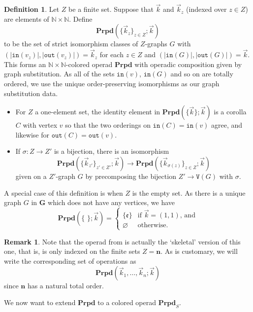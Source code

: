 \documentclass{amsart}
\numberwithin{theorem}{subsection}
\theoremstyle{definition}
\newtheorem{definition}[theorem]{Definition}
\newtheorem{remark}[theorem]{Remark}
\newcommand{\xfe}{\mathfrak{e}}
\newcommand{\bbY}{\mathbf{G}}
\newcommand{\out}{\mathtt{out}}
\newcommand{\inp}{\mathtt{in}}
\newcommand{\vertex}{\mathtt{V}}
\newcommand{\bfproperad}{\mathbf{Prpd}}
\newcommand{\nsqelt}[1]{\vec{#1}}
\begin{document}
\begin{definition}\label{def Prd}
Let $Z$ be a finite set.
Suppose that $\nsqelt{k}$ and $\nsqelt{k}_z$ (indexed over $z\in Z$) are elements of $\mathbb{N}\times\mathbb{N}$.
Define
\[
	\bfproperad(\{\nsqelt{k}_z\}_{z\in Z}; \nsqelt{k})
\]
to be the set of strict isomorphism classes of $Z$-graphs $G$ with $(|\inp(v_z)|, |\out(v_z)|) = \nsqelt{k}_z$ for each $z \in Z$ and $(|\inp(G)|, |\out(G)|) = \nsqelt{k}$.
This forms an $\mathbb{N}\times \mathbb{N}$-colored operad $\bfproperad$ with operadic composition given by graph substitution.
As all of the sets $\inp(v)$, $\inp(G)$ and so on are totally ordered, we use the unique order-preserving isomorphisms as our graph substitution data.
\begin{itemize}
	\item 
	For $Z$ a one-element set, the identity element in $\bfproperad(\{\nsqelt{k}\}; \nsqelt{k})$ is a corolla $C$ with vertex $v$ so that the two orderings on $\inp(C) = \inp(v)$ agree, and likewise for $\out(C) = \out(v)$.
	\item If $\sigma \colon  Z \to Z'$ is a bijection, there is an isomorphism
	\[
		\bfproperad(\{\nsqelt{k}_{z'}\}_{z'\in Z'}; \nsqelt{k}) \to \bfproperad(\{\nsqelt{k}_{\sigma(z)}\}_{z\in Z}; \nsqelt{k})
	\]
	given on a $Z'$-graph $G$ by precomposing the bijection $Z' \to \vertex(G)$ with $\sigma$.
\end{itemize}
\end{definition}

A special case of this definition is when $Z$ is the empty set.
As there is a unique graph $G$ in $\bbY$ which does not have any vertices, we have
\[
	\bfproperad(\{\,\, \}; \nsqelt{k}) = \begin{cases}
		\{ \xfe \} & \text{if $\nsqelt{k} = (1,1)$, and} \\
		\varnothing & \text{otherwise.}
	\end{cases}
\]

\begin{remark}
Note that the operad from \cite[\S 14.1]{YauJohnson:FPAM} is actually the `skeletal' version of this one, that is, is only indexed on the finite sets $Z = \mathbf{n}$.
As is customary, we will write the corresponding set of operations as 
\[
	\bfproperad(\nsqelt{k}_1, \dots, \nsqelt{k}_n; \nsqelt{k})
\]
since $\mathbf{n}$ has a natural total order.
\end{remark}

We now want to extend $\bfproperad$ to a colored operad $\bfproperad_S$.
\end{document}
